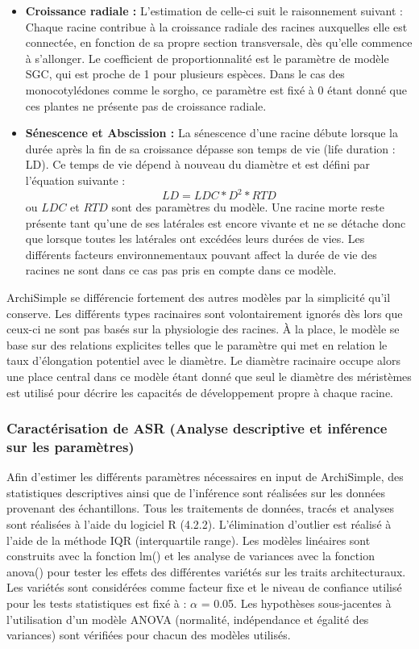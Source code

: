 \begin{itemize}
    \item \textbf{Croissance radiale :}
    L'estimation de celle-ci suit le raisonnement suivant :
    Chaque racine contribue à la croissance radiale des racines auxquelles elle est connectée, en fonction de sa propre section transversale, dès qu'elle commence à s'allonger. 
    Le coefficient de proportionnalité est le paramètre de modèle SGC, qui est proche de 1 pour plusieurs espèces.
    Dans le cas des monocotylédones comme le sorgho, ce paramètre est fixé à 0 étant donné que ces plantes ne présente pas de croissance radiale.
    \item \textbf{Sénescence et Abscission :}
    La sénescence d'une racine débute lorsque la durée après la fin de sa croissance dépasse son temps de vie (life duration : LD).
    Ce temps de vie dépend à nouveau du diamètre et est défini par l'équation suivante :
    \begin{equation} 
    LD=LDC*D^2*RTD 
    \label{eq:LD}
    \end{equation}
    ou $LDC$ et $RTD$ sont des paramètres du modèle.
    Une racine morte reste présente tant qu'une de ses latérales est encore vivante et ne se détache donc que lorsque toutes les latérales ont excédées leurs durées de vies.
    Les différents facteurs environnementaux pouvant affect la durée de vie des racines ne sont dans ce cas pas pris en compte dans ce modèle.
\end{itemize}

ArchiSimple se différencie fortement des autres modèles par la simplicité qu'il conserve.
Les différents types racinaires sont volontairement ignorés dès lors que ceux-ci ne sont pas basés sur la physiologie des racines.
À la place, le modèle se base sur des relations explicites telles que le paramètre qui met en relation le taux d'élongation potentiel avec le diamètre.
Le diamètre racinaire occupe alors une place central dans ce modèle étant donné que seul le diamètre des méristèmes est utilisé pour décrire les capacités de développement propre à chaque racine.

\subsubsection{Caractérisation de ASR (Analyse descriptive et inférence sur les paramètres)}

Afin d'estimer les différents paramètres nécessaires en input de ArchiSimple, des statistiques descriptives ainsi que de l'inférence sont réalisées sur les données provenant des échantillons.
Tous les traitements de données, tracés et analyses sont réalisées à l'aide du logiciel R (4.2.2).
L'élimination d'outlier est réalisé à l'aide de la méthode IQR (interquartile range).
Les modèles linéaires sont construits avec la fonction lm() et les analyse de variances avec la fonction anova() pour tester les effets des différentes variétés sur les traits architecturaux.
Les variétés sont considérées comme facteur fixe et le niveau de confiance utilisé pour les tests statistiques est fixé à : $\alpha$ = 0.05.
Les hypothèses sous-jacentes à l'utilisation d'un modèle ANOVA (normalité, indépendance et égalité des variances) sont vérifiées pour chacun des modèles utilisés.
\newline

